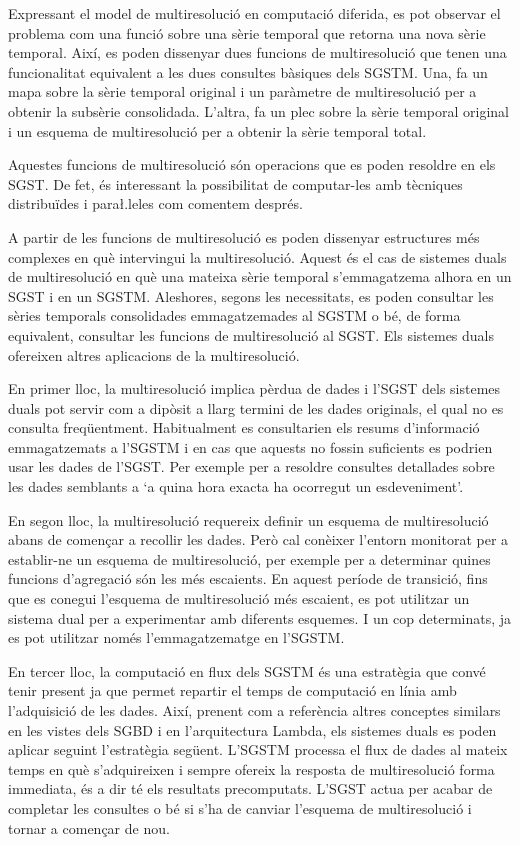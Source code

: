 Expressant el model de multiresolució en computació diferida, es pot
observar el problema com una funció sobre una sèrie temporal que
retorna una nova sèrie temporal. Així, es poden dissenyar dues
funcions de multiresolució que tenen una funcionalitat equivalent a
les dues consultes bàsiques dels \gls{SGSTM}. Una, fa un mapa sobre la
sèrie temporal original i un paràmetre de multiresolució per a obtenir
la subsèrie consolidada. L'altra, fa un plec sobre la sèrie temporal
original i un esquema de multiresolució per a obtenir la sèrie
temporal total.

Aquestes funcions de multiresolució són operacions que es poden
resoldre en els \gls{SGST}. De fet, és interessant la possibilitat de
computar-les amb tècniques distribuïdes i para\l.leles com comentem
després.




A partir de les funcions de multiresolució es poden dissenyar
estructures més complexes en què intervingui la multiresolució. Aquest
és el cas de sistemes duals de multiresolució en què una mateixa sèrie
temporal s'emmagatzema alhora en un \gls{SGST} i en un
\gls{SGSTM}. Aleshores, segons les necessitats, es poden consultar les
sèries temporals consolidades emmagatzemades al \gls{SGSTM} o bé, de
forma equivalent, consultar les funcions de multiresolució al
\gls{SGST}.  
Els sistemes duals ofereixen altres aplicacions de la
multiresolució.

En primer lloc, la multiresolució implica pèrdua de dades i
l'\gls{SGST} dels sistemes duals pot servir com a dipòsit a llarg
termini de les dades originals, el qual no es consulta
freqüentment. Habitualment es consultarien els resums d'informació
emmagatzemats a l'\gls{SGSTM} i en cas que aquests no fossin
suficients es podrien usar les dades de l'\gls{SGST}. Per exemple per
a resoldre consultes detallades sobre les dades semblants a `a quina
hora exacta ha ocorregut un esdeveniment'.

En segon lloc, la multiresolució requereix definir un esquema de
multiresolució abans de començar a recollir les dades.  Però cal
conèixer l'entorn monitorat per a establir-ne un esquema de
multiresolució, per exemple per a determinar quines funcions
d'agregació són les més escaients.  En aquest període de transició,
fins que es conegui l'esquema de multiresolució més escaient, es pot
utilitzar un sistema dual per a experimentar amb diferents esquemes. I
un cop determinats, ja es pot utilitzar només l'emmagatzematge en
l'\gls{SGSTM}.

En tercer lloc, la computació en flux dels \gls{SGSTM} és una
estratègia que convé tenir present ja que permet repartir el temps de
computació en línia amb l'adquisició de les dades.  Així, prenent com
a referència altres conceptes similars en les vistes dels \gls{SGBD} i
en l'arquitectura Lambda, els sistemes duals es poden aplicar seguint
l'estratègia següent. L'\gls{SGSTM} processa el flux de dades al
mateix temps en què s'adquireixen i sempre ofereix la resposta de
multiresolució forma immediata, és a dir té els resultats
precomputats. L'\gls{SGST} actua per acabar de completar les consultes
o bé si s'ha de canviar l'esquema de multiresolució i tornar a
començar de nou.



